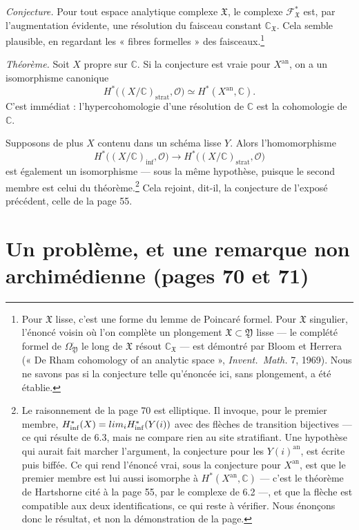 \documentclass[11pt,a4paper]{article}
\begin{document}
\emph{Conjecture.} Pour tout espace analytique complexe $\mathfrak{X}$, le
complexe $\mathcal{F}^{*}_{\mathfrak{X}}$ est, par l'augmentation évidente, une
résolution du faisceau constant $\mathbb{C}_{\mathfrak{X}}$. Cela semble
plausible, en regardant les « fibres formelles » des faisceaux.\footnote{Pour
$\mathfrak{X}$ lisse, c'est une forme du lemme de Poincaré formel. Pour
$\mathfrak{X}$ singulier, l'énoncé voisin où l'on complète un plongement
$\mathfrak{X} \subset \mathfrak{Y}$ lisse — le complété formel de
$\Omega^{\cdot}_{\mathfrak{Y}}$ le long de $\mathfrak{X}$ résout
$\mathbb{C}_{\mathfrak{X}}$ — est démontré par Bloom et Herrera (« De Rham
cohomology of an analytic space », \emph{Invent.\ Math.} 7, 1969). Nous ne
savons pas si la conjecture telle qu'énoncée ici, sans plongement, a été
établie.}

\emph{Théorème.} Soit $X$ propre sur $\mathbb{C}$. Si la conjecture est vraie
pour $X^{\mathrm{an}}$, on a un isomorphisme canonique
\[
  H^{*}\bigl((X/\mathbb{C})_{\mathrm{strat}}, \mathcal{O}\bigr) \simeq
  H^{*}(X^{\mathrm{an}}, \mathbb{C}) .
\]
C'est immédiat : l'hypercohomologie d'une résolution de $\mathbb{C}$ est la
cohomologie de $\mathbb{C}$.

Supposons de plus $X$ contenu dans un schéma lisse $Y$. Alors l'homomorphisme
\[
  H^{*}\bigl((X/\mathbb{C})_{\mathrm{inf}}, \mathcal{O}\bigr) \longrightarrow
  H^{*}\bigl((X/\mathbb{C})_{\mathrm{strat}}, \mathcal{O}\bigr)
\]
est également un isomorphisme — sous la même hypothèse, puisque le second
membre est celui du théorème.\footnote{Le raisonnement de la page 70 est
elliptique. Il invoque, pour le premier membre, $H^{*}_{\mathrm{inf}}(X) =
\varprojlim_i H^{*}_{\mathrm{inf}}(Y(i))$ avec des flèches de transition
bijectives — ce qui résulte de 6.3, mais ne compare rien au site
stratifiant. Une hypothèse qui aurait fait marcher l'argument, la conjecture
pour les $Y(i)^{\mathrm{an}}$, est écrite puis biffée. Ce qui rend l'énoncé
vrai, sous la conjecture pour $X^{\mathrm{an}}$, est que le premier membre
est lui aussi isomorphe à $H^{*}(X^{\mathrm{an}}, \mathbb{C})$ — c'est le
théorème de Hartshorne cité à la page 55, par le complexe de 6.2 —, et que
la flèche est compatible aux deux identifications, ce qui reste à vérifier.
Nous énonçons donc le résultat, et non la démonstration de la page.} Cela
rejoint, dit-il, la conjecture de l'exposé précédent, celle de la page 55.

\section*{Un problème, et une remarque non archimédienne (pages 70 et 71)}
\end{document}
